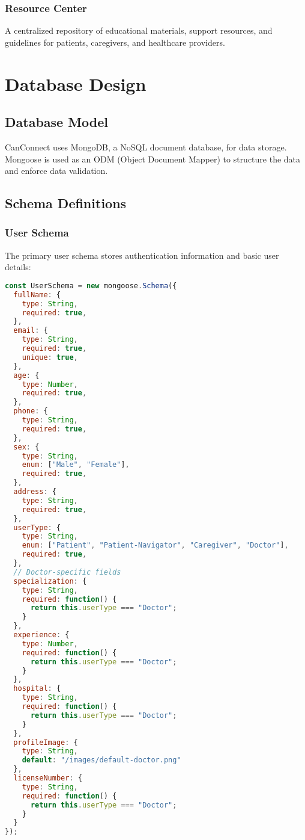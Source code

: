 \documentclass[12pt,a4paper]{report}
\begin{document}
\subsection{Resource Center}
A centralized repository of educational materials, support resources, and guidelines for patients, caregivers, and healthcare providers.

\chapter{Database Design}

\section{Database Model}
CanConnect uses MongoDB, a NoSQL document database, for data storage. Mongoose is used as an ODM (Object Document Mapper) to structure the data and enforce data validation.

\section{Schema Definitions}

\subsection{User Schema}
The primary user schema stores authentication information and basic user details:

\begin{lstlisting}[language=JavaScript]
const UserSchema = new mongoose.Schema({
  fullName: {
    type: String,
    required: true,
  },
  email: {
    type: String,
    required: true,
    unique: true,
  },
  age: {
    type: Number,
    required: true,
  },
  phone: {
    type: String,
    required: true,
  },
  sex: {
    type: String,
    enum: ["Male", "Female"],
    required: true,
  },
  address: {
    type: String,
    required: true,
  },
  userType: {
    type: String,
    enum: ["Patient", "Patient-Navigator", "Caregiver", "Doctor"],
    required: true,
  },
  // Doctor-specific fields
  specialization: {
    type: String,
    required: function() {
      return this.userType === "Doctor";
    }
  },
  experience: {
    type: Number,
    required: function() {
      return this.userType === "Doctor";
    }
  },
  hospital: {
    type: String,
    required: function() {
      return this.userType === "Doctor";
    }
  },
  profileImage: {
    type: String,
    default: "/images/default-doctor.png"
  },
  licenseNumber: {
    type: String,
    required: function() {
      return this.userType === "Doctor";
    }
  }
});
\end{lstlisting}
\end{document}
